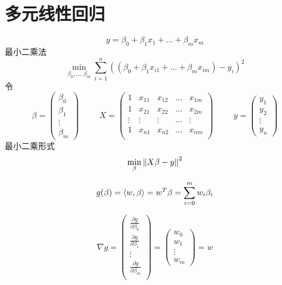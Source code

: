 \documentclass[11pt]{article}
\begin{document}
\section{多元线性回归}
\label{sec:org1d83bbd}
\begin{equation*}
y=\beta_0+\beta_1x_1+\dots+\beta_mx_m
\end{equation*}
最小二乘法
\begin{equation*}
\min_{\beta_0,\dots,\beta_m}\sum_{i=1}^n((\beta_0+\beta_1x_{i1}+\dots+\beta_mx_{im})-y_i)^2
\end{equation*}
令
\begin{equation*}
\beta=
\begin{pmatrix}
\beta_0\\\beta_1\\\vdots\\\beta_m
\end{pmatrix}\hspace{1cm}
X=
\begin{pmatrix}
1&x_{11}&x_{12}&\dots&x_{1m}\\
1&x_{21}&x_{22}&\dots&x_{2m}\\
\vdots&\vdots&\vdots&\dots&\vdots\\
1&x_{n1}&x_{n2}&\dots&x_{nm}\\
\end{pmatrix}\hspace{1cm}
y=
\begin{pmatrix}
y_1\\y_2\\\vdots\\y_n
\end{pmatrix}
\end{equation*}
最小二乘形式
\begin{equation*}
\min_{\beta}\left\lVert X\beta-y\right\rVert^2
\end{equation*}

\begin{equation*}
g(\beta)=\langle w,\beta\rangle=w^T\beta=\sum_{i=0}^mw_i\beta_i
\end{equation*}

\begin{equation*}
\nabla g=
\begin{pmatrix}
\frac{\partial g}{\partial \beta_0}\\
\frac{\partial g}{\partial \beta_1}\\
\vdots\\
\frac{\partial g}{\partial \beta_m}\\
\end{pmatrix}=
\begin{pmatrix}
w_0\\w_1\\\vdots\\w_m
\end{pmatrix}=w
\end{equation*}
\end{document}
